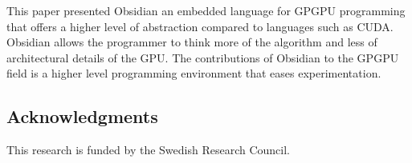 
This paper presented Obsidian an embedded language for GPGPU programming that
offers a higher level of abstraction compared to languages such as CUDA. 
Obsidian allows the programmer to think more of the algorithm and less of 
architectural details of the GPU. The contributions of Obsidian to the GPGPU 
field is a higher level programming environment that eases experimentation. 

\subsection*{Acknowledgments}
\noindent
This research is funded by the Swedish Research Council.




		






%
